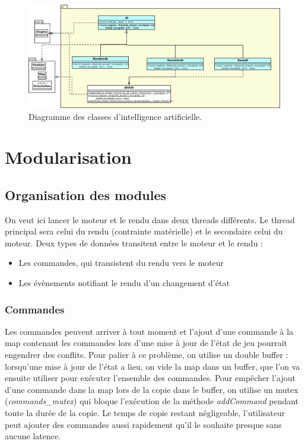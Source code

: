 \documentclass[a4paper,12pt]{article}
\begin{document}
    \begin{landscape}
    \begin{figure}[p]
    \includegraphics[width=0.9\paperheight]{ai.png}
    \caption{\label{uml:ai}Diagramme des classes d'intelligence artificielle.}
    \end{figure}
    \end{landscape}


    \section{Modularisation}
    \label{sec:module}

    \subsection{Organisation des modules}
	On veut ici lancer le moteur et le rendu dans deux threads différents. Le thread principal sera celui du rendu (contrainte matérielle) et le secondaire celui du moteur. Deux types de données transitent entre le moteur et le rendu : 
\begin{itemize}
\item Les commandes, qui transistent du rendu vers le moteur
\item Les évènements notifiant le rendu d'un changement d'état
\end{itemize}
\subsubsection{Commandes}
    Les commandes peuvent arriver à tout moment et l'ajout d'une commande à la map contenant les commandes lors d'une mise à jour de l'état de jeu pourrait engendrer des conflits. Pour palier à ce problème, on utilise un double buffer : lorsqu'une mise à jour de l'état a lieu, on vide la map dans un buffer, que l'on va ensuite utiliser pour exécuter l'ensemble des commandes. Pour empêcher l'ajout d'une commande dans la map lors de la copie dans le buffer, on utilise un mutex (\emph{commands\_mutex}) qui bloque l'exécution de la méthode \emph{addCommand} pendant toute la durée de la copie. Le temps de copie restant négligeable, l'utilisateur peut ajouter des commandes aussi rapidement qu'il le souhaite presque sans aucune latence.
\end{document}
